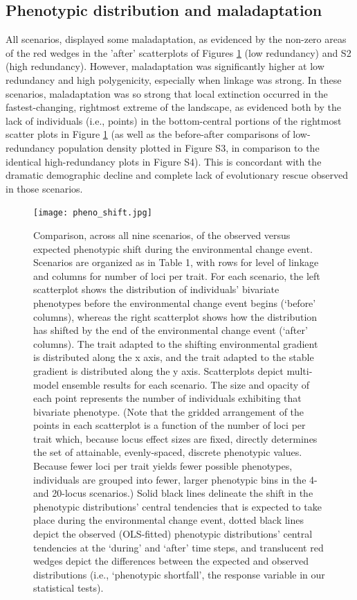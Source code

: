 \documentclass[9pt,twocolumn,twoside,lineno]{pnas-new}
\begin{document}
\subsection{Phenotypic distribution and maladaptation}

All scenarios, displayed some maladaptation, as evidenced by the non-zero areas of the red wedges
in the 'after' scatterplots of Figures \ref{fig:pheno_shift} (low redundancy) and S2 (high redundancy).
However, maladaptation was significantly higher at low redundancy and high polygenicity,
especially when linkage was strong. 
In these scenarios, maladaptation was so strong that local extinction occurred
in the fastest-changing, rightmost extreme of the landscape,
as evidenced both by the lack of individuals (i.e., points)
in the bottom-central portions
of the rightmost scatter plots in Figure \ref{fig:pheno_shift}
(as well as the before-after comparisons of low-redundancy population density plotted in
Figure S3, in comparison to the identical high-redundancy plots in Figure S4).
This is concordant with the dramatic demographic decline and complete lack of evolutionary rescue
observed in those scenarios.

\begin{figure}
\centering
\texttt{[image: pheno\_shift.jpg]}
\caption{Comparison, across all nine scenarios, of the observed versus expected phenotypic shift during the environmental change event. Scenarios are organized as in Table 1, with rows for level of linkage and columns for number of loci per trait. For each scenario, the left scatterplot shows the distribution of individuals’ bivariate phenotypes before the environmental change event begins (‘before’ columns), whereas the right scatterplot shows how the distribution has shifted by the end of the environmental change event (‘after’ columns). The trait adapted to the shifting environmental gradient is distributed along the x axis, and the trait adapted to the stable gradient is distributed along the y axis. Scatterplots depict multi-model ensemble results for each scenario. The size and opacity of each point represents the number of individuals exhibiting that bivariate phenotype. (Note that the gridded arrangement of the points in each scatterplot is a function of the number of loci per trait which, because locus effect sizes are fixed, directly determines the set of attainable, evenly-spaced, discrete phenotypic values. Because fewer loci per trait yields fewer possible phenotypes, individuals are grouped into fewer, larger phenotypic bins in the 4- and 20-locus scenarios.) Solid black lines delineate the shift in the phenotypic distributions’ central tendencies that is expected to take place during the environmental change event, dotted black lines depict the observed (OLS-fitted) phenotypic distributions’ central tendencies at the ‘during’ and ‘after’ time steps, and translucent red wedges depict the differences between the expected and observed distributions (i.e., ‘phenotypic shortfall’, the response variable in our statistical tests).
}
\label{fig:pheno_shift}
\end{figure}
\end{document}
